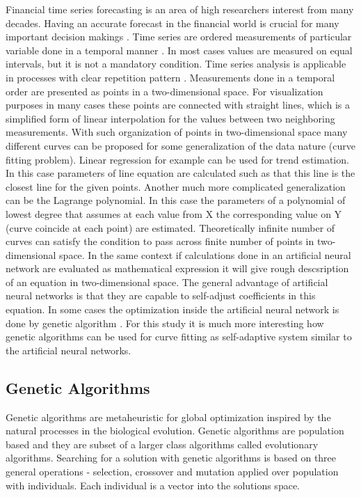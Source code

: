 \documentclass[graybox]{svmult}
\begin{document}
Financial time series forecasting is an area of high researchers interest \cite{nava01} from many decades. Having an accurate forecast in the financial world is crucial for many important decision makings \cite{catania01}. Time series are ordered measurements of particular variable done in a temporal manner \cite{chen01}. In most cases values are measured on equal intervals, but it is not a mandatory condition. Time series analysis is applicable in processes with clear repetition pattern \cite{mueen01}. Measurements done in a temporal order are presented as points in a two-dimensional space. For visualization purposes in many cases these points are connected with straight lines, which is a simplified form of linear interpolation for the values between two neighboring measurements. With such organization of points in two-dimensional space many different curves can be proposed for some generalization of the data nature (curve fitting problem). Linear regression for example can be used for trend estimation. In this case parameters of line equation are calculated such as that this line is the closest line for the given points. Another much more complicated generalization can be the Lagrange polynomial. In this case the parameters of a polynomial of lowest degree that assumes at each value from X the corresponding value on Y (curve coincide at each point) are estimated. Theoretically infinite number of curves can satisfy the condition to pass across finite number of points in two-dimensional space. In the same context if calculations done in an artificial neural network are evaluated as mathematical expression it will give rough descsription of an equation in two-dimensional space. The general advantage of artificial neural networks is that they are capable to self-adjust coefficients \cite{aljarah01} in this equation. In some cases the optimization inside the artificial neural network is done by genetic algorithm \cite{zhang01,kapanova01}. For this study it is much more interesting how genetic algorithms can be used for curve fitting as self-adaptive system similar to the artificial neural networks. 

\subsection{Genetic Algorithms} \label{Genetic Algorithms}

Genetic algorithms are metaheuristic for global optimization inspired by the natural processes in the biological evolution. Genetic algorithms are population based and they are subset of a larger class algorithms called evolutionary algorithms. Searching for a solution with genetic algorithms is based on three general operations - selection, crossover and mutation applied over population with individuals. Each individual is a vector into the solutions space. 
\end{document}
